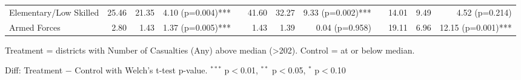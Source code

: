 \begin{table}[htbp]
\begin{tabular}{l rrr c rrr c rrr}
\quad Elementary/Low Skilled & 25.46 & 21.35 & 4.10 (p=0.004)*** &  & 41.60 & 32.27 & 9.33 (p=0.002)*** &  & 14.01 & 9.49 & 4.52 (p=0.214) \\
\quad Armed Forces & 2.80 & 1.43 & 1.37 (p=0.005)*** &  & 1.43 & 1.39 & 0.04 (p=0.958) &  & 19.11 & 6.96 & 12.15 (p=0.001)*** \\
\bottomrule
\end{tabular}
\begin{tablenotes}
\small
\item Treatment = districts with Number of Casualties (Any) above median (>202). Control = at or below median.
\item Diff: Treatment $-$ Control with Welch's t-test p-value. $^{{***}}$ p$<$0.01, $^{{**}}$ p$<$0.05, $^{{*}}$ p$<$0.10
\end{tablenotes}
\end{table}

\clearpage

